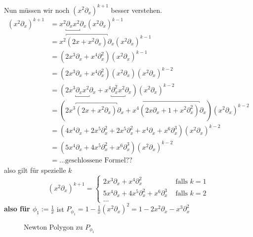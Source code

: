 Nun müssen wir noch $(x^2\partial_x)^{k+1}$ besser verstehen.
\begin{align*}
(x^2\partial_x)^{k+1} &=x^2\underbracket{\partial_xx^2}\partial_x
                        (x^2\partial_x)^{k-1}\\
                      &=x^2\overbracket{(2x+x^{2}\partial_x)}\partial_x
                        (x^2\partial_x)^{k-1}\\
                      &=(2x^3\partial_x+x^{4}\partial_x^2)
                        (x^2\partial_x)^{k-1}\\
                      &=(2x^3\partial_x+x^{4}\partial_x^2)(x^2\partial_x)
                        (x^2\partial_x)^{k-2}\\
                      &=(2x^3\underbracket{\partial_xx^2}\partial_x
                        +x^{4}\underbracket{\partial_x^2x^2}\partial_x)
                        (x^2\partial_x)^{k-2}\\
                      &=(2x^3\overbracket{(2x+x^{2}\partial_x)}\partial_x
                        +x^{4}\overbracket{(2x\partial_x+1+x^2\partial_x^2)}
                        \partial_x) (x^2\partial_x)^{k-2}\\
                      &=(4x^4\partial_x+2x^{5}\partial_x^2
                        +2x^{5}\partial_x^2
                        +x^4\partial_x
                        +x^6\partial_x^3)
                        (x^2\partial_x)^{k-2}\\
                      &=(5x^4\partial_x+4x^{5}\partial_x^2
                        +x^6\partial_x^3)
                        (x^2\partial_x)^{k-2}\\
                      &=\dots \mbox{geschlossene Formel??}
\end{align*}
also gilt für spezielle $k$
\[
(x^2\partial_x)^{k+1}=
\begin{cases}
2x^3\partial_x+x^{4}\partial_x^2 & \mbox{ falls } k=1\\
5x^4\partial_x+4x^{5}\partial_x^2 +x^6\partial_x^3 & \mbox{ falls } k=2\\
\dots
\end{cases}
\]
\textbf{also für $\phi_1:=\frac{1}{x}$} ist
$P_{\phi_1}=1-\frac{1}{x}(x^2\partial_x)^{2}=1-2x^2\partial_x-x^{3}\partial_x^2$
\begin{figure}[H]
\caption{Newton Polygon zu $P_{\phi_1}$}
\begin{center}
\end{center}
\end{figure}

